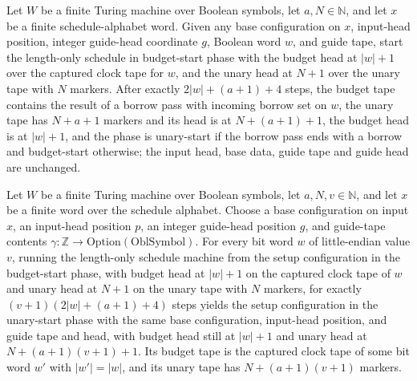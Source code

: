 \begin{lemma}
\label{Complexity.setupCfg_budget_round}
\leanok
{}
Let $W$ be a finite Turing machine over Boolean symbols, let $a,N\in\mathbb{N}$, and let
$x$ be a finite schedule-alphabet word. Given any base configuration on $x$, input-head
position, integer guide-head coordinate $g$, Boolean word $w$, and guide tape, start the
length-only schedule in budget-start phase with the budget head at $|w|+1$ over the
captured clock tape for $w$, and the unary head at $N+1$ over the unary tape with $N$
markers. After exactly $2|w|+(a+1)+4$ steps, the budget tape contains the result of a
borrow pass with incoming borrow set on $w$, the unary tape has $N+a+1$ markers and its
head is at $N+(a+1)+1$, the budget head is at $|w|+1$, and the phase is unary-start if
the borrow pass ends with a borrow and budget-start otherwise; the input head, base
data, guide tape and guide head are unchanged.
\end{lemma}

\begin{lemma}
\label{Complexity.setupCfg_budget_all}
\leanok
{}
Let $W$ be a finite Turing machine over Boolean symbols, let $a,N,v\in\mathbb{N}$, and
let $x$ be a finite word over the schedule alphabet. Choose a base configuration on
input $x$, an input-head position $p$, an integer guide-head position $g$, and
guide-tape contents $\gamma\colon\mathbb{Z}\to\mathrm{Option}(\mathrm{OblSymbol})$. For
every bit word $w$ of little-endian value $v$, running the length-only schedule machine
from the setup configuration in the budget-start phase, with budget head at $|w|+1$ on
the captured clock tape of $w$ and unary head at $N+1$ on the unary tape with $N$
markers, for exactly $(v+1)(2|w|+(a+1)+4)$ steps yields the setup configuration in the
unary-start phase with the same base configuration, input-head position, and guide tape
and head, with budget head still at $|w|+1$ and unary head at $N+(a+1)(v+1)+1$. Its
budget tape is the captured clock tape of some bit word $w'$ with $|w'|=|w|$, and its
unary tape has $N+(a+1)(v+1)$ markers.
\end{lemma}

